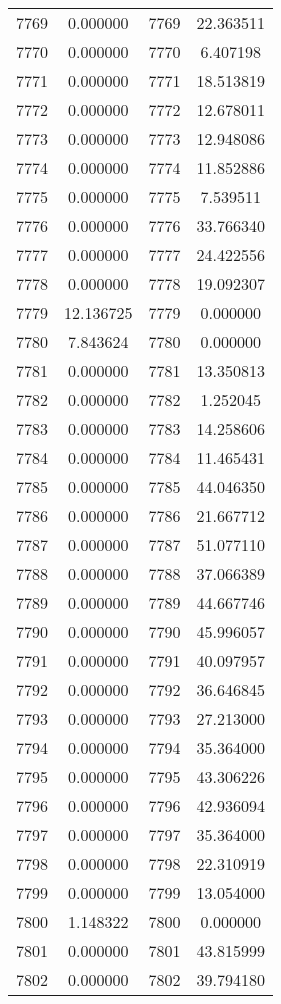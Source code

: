 \documentclass[12pt]{article}
\begin{document}
\begin{longtable}{@{}cccc@{}}
7769 & 0.000000 & 7769 & 22.363511 \\
7770 & 0.000000 & 7770 & 6.407198 \\
7771 & 0.000000 & 7771 & 18.513819 \\
7772 & 0.000000 & 7772 & 12.678011 \\
7773 & 0.000000 & 7773 & 12.948086 \\
7774 & 0.000000 & 7774 & 11.852886 \\
7775 & 0.000000 & 7775 & 7.539511 \\
7776 & 0.000000 & 7776 & 33.766340 \\
7777 & 0.000000 & 7777 & 24.422556 \\
7778 & 0.000000 & 7778 & 19.092307 \\
7779 & 12.136725 & 7779 & 0.000000 \\
7780 & 7.843624 & 7780 & 0.000000 \\
7781 & 0.000000 & 7781 & 13.350813 \\
7782 & 0.000000 & 7782 & 1.252045 \\
7783 & 0.000000 & 7783 & 14.258606 \\
7784 & 0.000000 & 7784 & 11.465431 \\
7785 & 0.000000 & 7785 & 44.046350 \\
7786 & 0.000000 & 7786 & 21.667712 \\
7787 & 0.000000 & 7787 & 51.077110 \\
7788 & 0.000000 & 7788 & 37.066389 \\
7789 & 0.000000 & 7789 & 44.667746 \\
7790 & 0.000000 & 7790 & 45.996057 \\
7791 & 0.000000 & 7791 & 40.097957 \\
7792 & 0.000000 & 7792 & 36.646845 \\
7793 & 0.000000 & 7793 & 27.213000 \\
7794 & 0.000000 & 7794 & 35.364000 \\
7795 & 0.000000 & 7795 & 43.306226 \\
7796 & 0.000000 & 7796 & 42.936094 \\
7797 & 0.000000 & 7797 & 35.364000 \\
7798 & 0.000000 & 7798 & 22.310919 \\
7799 & 0.000000 & 7799 & 13.054000 \\
7800 & 1.148322 & 7800 & 0.000000 \\
7801 & 0.000000 & 7801 & 43.815999 \\
7802 & 0.000000 & 7802 & 39.794180 \\

\end{longtable}
\end{document}
